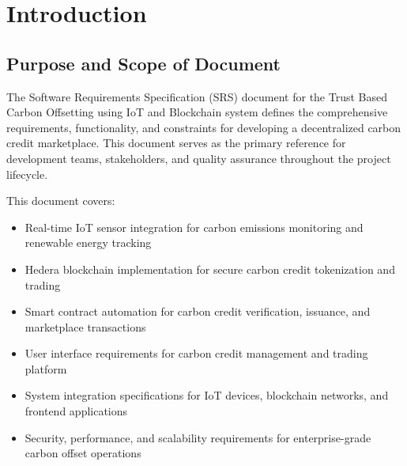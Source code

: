 \documentclass[oneside,a4paper,12pt]{book}
\begin{document}
\section{Introduction}

\subsection{Purpose and Scope of Document}
The Software Requirements Specification (SRS) document for the Trust Based Carbon Offsetting using IoT and Blockchain system defines the comprehensive requirements, functionality, and constraints for developing a decentralized carbon credit marketplace. This document serves as the primary reference for development teams, stakeholders, and quality assurance throughout the project lifecycle.

This document covers:
\begin{itemize}
    \item Real-time IoT sensor integration for carbon emissions monitoring and renewable energy tracking
    \item Hedera blockchain implementation for secure carbon credit tokenization and trading
    \item Smart contract automation for carbon credit verification, issuance, and marketplace transactions
    \item User interface requirements for carbon credit management and trading platform
    \item System integration specifications for IoT devices, blockchain networks, and frontend applications
    \item Security, performance, and scalability requirements for enterprise-grade carbon offset operations
\end{itemize}
\end{document}
